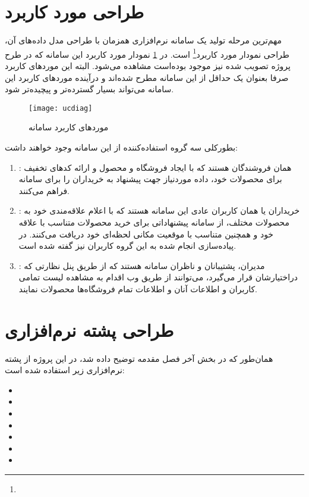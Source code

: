 \newpage

\section{طراحی مورد کاربرد}

مهم‌ترین مرحله تولید یک سامانه نرم‌افزاری همزمان با طراحی مدل داده‌های آن، طراحی نمودار مورد کاربرد\footnote{} است. در \cref{fig:ucdiag} نمودار مورد کاربرد این سامانه که در طرح پروژه تصویب شده نیز موجود بوده‌است مشاهده می‌شود. البته این موردهای کاربرد صرفا بعنوان یک حداقل از این سامانه مطرح شده‌اند و درآینده موردهای کاربرد این سامانه می‌تواند بسیار گسترده‌تر و پیچیده‌تر شود.

\begin{figure}[H]
	\centering
	\texttt{[image: ucdiag]}
	\caption{موردهای کاربرد سامانه}
	\label{fig:ucdiag}
\end{figure}

بطورکلی سه گروه استفاده‌کننده از این سامانه وجود خواهند داشت:
\begin{enumerate}
	\item {}: همان فروشندگان هستند که با ایجاد فروشگاه و محصول و ارائه کدهای تخفیف برای محصولات خود، داده موردنیاز جهت پیشنهاد به خریداران را برای سامانه فراهم می‌کنند.
	\item {}: خریداران یا همان کاربران عادی این سامانه هستند که با اعلام علاقه‌مندی خود به محصولات مختلف، از سامانه پیشنهاداتی برای خرید محصولات متناسب با علاقه خود و همچنین متناسب با موقعیت مکانی لحظه‌ای خود دریافت می‌کنند. در پیاده‌سازی انجام شده به این گروه کاربران  نیز گفته شده است.
	\item {}: مدیران، پشتیبانان و ناظران سامانه هستند که از طریق پنل نظارتی که دراختیارشان قرار می‌گیرد، می‌توانند از طریق وب اقدام به مشاهده لیست تمامی کاربران و اطلاعات آنان و اطلاعات تمام فروشگاه‌ها محصولات نمایند.
\end{enumerate}

\newpage

\section{طراحی پشته نرم‌افزاری}

همان‌طور که در بخش آخر فصل مقدمه توضیح داده شد، در این پروژه از پشته نرم‌افزاری زیر استفاده شده است:

\begin{itemize}
	\item {}
	\item {}
	\item {}
	\item {}
	\item {}				
	\item {}
	\item {}
\end{itemize}

